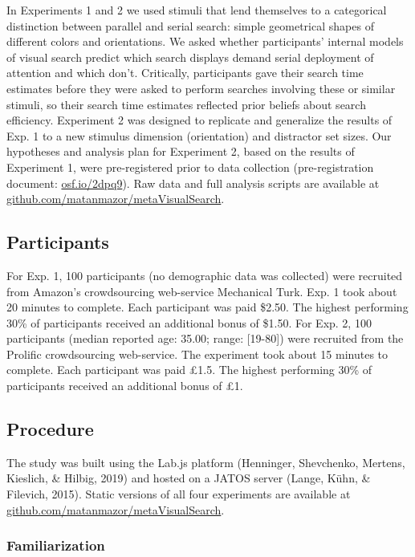 \documentclass[12pt,twoside]{reedthesis}
\begin{document}
In Experiments 1 and 2 we used stimuli that lend themselves to a categorical distinction between parallel and serial search: simple geometrical shapes of different colors and orientations. We asked whether participants' internal models of visual search predict which search displays demand serial deployment of attention and which don't. Critically, participants gave their search time estimates before they were asked to perform searches involving these or similar stimuli, so their search time estimates reflected prior beliefs about search efficiency. Experiment 2 was designed to replicate and generalize the results of Exp. 1 to a new stimulus dimension (orientation) and distractor set sizes. Our hypotheses and analysis plan for Experiment 2, based on the results of Experiment 1, were pre-registered prior to data collection (pre-registration document: \url{osf.io/2dpq9}). Raw data and full analysis scripts are available at \url{github.com/matanmazor/metaVisualSearch}.

\hypertarget{participants-2}{%
\subsection{Participants}\label{participants-2}}

For Exp. 1, 100 participants (no demographic data was collected) were recruited from Amazon's crowdsourcing web-service Mechanical Turk. Exp. 1 took about 20 minutes to complete. Each participant was paid \$2.50. The highest performing 30\% of participants received an additional bonus of \$1.50. For Exp. 2, 100 participants (median reported age: 35.00; range: {[}19-80{]}) were recruited from the Prolific crowdsourcing web-service. The experiment took about 15 minutes to complete. Each participant was paid £1.5. The highest performing 30\% of participants received an additional bonus of £1.

\hypertarget{procedure-2}{%
\subsection{Procedure}\label{procedure-2}}

The study was built using the Lab.js platform (Henninger, Shevchenko, Mertens, Kieslich, \& Hilbig, 2019) and hosted on a JATOS server (Lange, Kühn, \& Filevich, 2015). Static versions of all four experiments are available at \url{github.com/matanmazor/metaVisualSearch}.

\hypertarget{familiarization}{%
\subsubsection*{Familiarization}\label{familiarization}}
\end{document}
